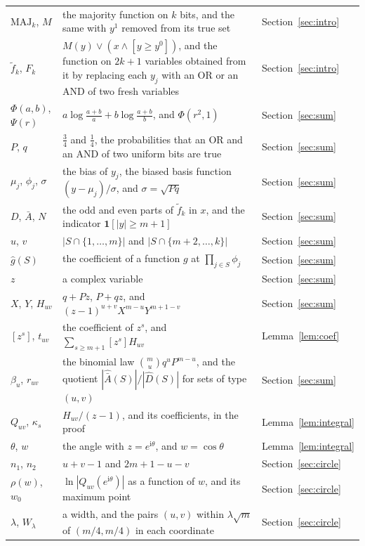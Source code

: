 \documentclass[11pt]{amsart}
\theoremstyle{remark}
\newcommand{\MAJ}{\mathrm{MAJ}}
\newcommand{\ii}{\mathrm{i}}
\begin{document}
\begin{longtable}{@{}>{\raggedright\arraybackslash}p{}>{\raggedright\arraybackslash}p{}>{\raggedright\arraybackslash}p{}@{}}
$\MAJ_k$, $M$ & the majority function on $k$ bits, and the same with $y^1$ removed from its true set & Section~\ref{sec:intro} \\
$\tilde f_k$, $F_k$ & $M(y)\vee(x\wedge[y\ge y^0])$, and the function on $2k+1$ variables obtained from it by replacing each $y_j$ with an OR or an AND of two fresh variables & Section~\ref{sec:intro} \\
$\Phi(a,b)$, $\Psi(r)$ & $a\log\frac{a+b}a+b\log\frac{a+b}b$, and $\Phi(r^2,1)$ & Section~\ref{sec:sum} \\
$P$, $q$ & $\frac34$ and $\frac14$, the probabilities that an OR and an AND of two uniform bits are true & Section~\ref{sec:sum} \\
$\mu_j$, $\phi_j$, $\sigma$ & the bias of $y_j$, the biased basis function $(y-\mu_j)/\sigma$, and $\sigma=\sqrt{Pq}$ & Section~\ref{sec:sum} \\
$D$, $\bar A$, $N$ & the odd and even parts of $\tilde f_k$ in $x$, and the indicator $\mathbf 1[|y|\ge m+1]$ & Section~\ref{sec:sum} \\
$u$, $v$ & $|S\cap\{1,\dots,m\}|$ and $|S\cap\{m+2,\dots,k\}|$ & Section~\ref{sec:sum} \\
$\hat g(S)$ & the coefficient of a function $g$ at $\prod_{j\in S}\phi_j$ & Section~\ref{sec:sum} \\
$z$ & a complex variable & Section~\ref{sec:sum} \\
$X$, $Y$, $H_{uv}$ & $q+Pz$, $P+qz$, and $(z-1)^{u+v}X^{m-u}Y^{m+1-v}$ & Section~\ref{sec:sum} \\
$[z^s]$, $t_{uv}$ & the coefficient of $z^s$, and $\sum_{s\ge m+1}[z^s]H_{uv}$ & Lemma~\ref{lem:coef} \\
$\beta_u$, $r_{uv}$ & the binomial law $\binom mu q^uP^{m-u}$, and the quotient $|\hat{\bar A}(S)|/|\hat D(S)|$ for sets of type $(u,v)$ & Section~\ref{sec:sum} \\
$Q_{uv}$, $\kappa_s$ & $H_{uv}/(z-1)$, and its coefficients, in the proof & Lemma~\ref{lem:integral} \\
$\theta$, $w$ & the angle with $z=e^{\ii\theta}$, and $w=\cos\theta$ & Lemma~\ref{lem:integral} \\
$n_1$, $n_2$ & $u+v-1$ and $2m+1-u-v$ & Section~\ref{sec:circle} \\
$\rho(w)$, $w_0$ & $\ln|Q_{uv}(e^{\ii\theta})|$ as a function of $w$, and its maximum point & Section~\ref{sec:circle} \\
$\lambda$, $W_\lambda$ & a width, and the pairs $(u,v)$ within $\lambda\sqrt m$ of $(m/4,m/4)$ in each coordinate & Section~\ref{sec:circle} \\

\end{longtable}
\end{document}
